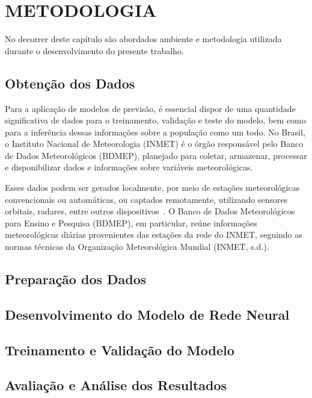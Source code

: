 \chapter{METODOLOGIA}

No decorrer deste capítulo são abordados ambiente e metodologia utilizada durante o
desenvolvimento do presente trabalho.

\section{Obtenção dos Dados}

    Para a aplicação de modelos de previsão, é essencial dispor de uma quantidade significativa de dados para o 
    treinamento, validação e teste do modelo, bem como para a inferência dessas informações sobre a população como um 
    todo. No Brasil, o Instituto Nacional de Meteorologia (INMET) é o órgão responsável pelo Banco de Dados 
    Meteorológicos (BDMEP), planejado para coletar, armazenar, processar e disponibilizar dados e informações sobre 
    variáveis meteorológicas. 

    Esses dados podem ser gerados localmente, por meio de estações meteorológicas convencionais ou automáticas, 
    ou captados remotamente, utilizando sensores orbitais, radares, entre outros dispositivos~\cite{vianna2017}. 
    O Banco de Dados Meteorológicos para Ensino e Pesquisa (BDMEP), em particular, reúne informações meteorológicas 
    diárias provenientes das estações da rede do INMET, seguindo as normas técnicas da Organização Meteorológica 
    Mundial (INMET, s.d.).

\section{Preparação dos Dados}


\section{Desenvolvimento do Modelo de Rede Neural}

\section{Treinamento e Validação do Modelo}

\section{Avaliação e Análise dos Resultados}